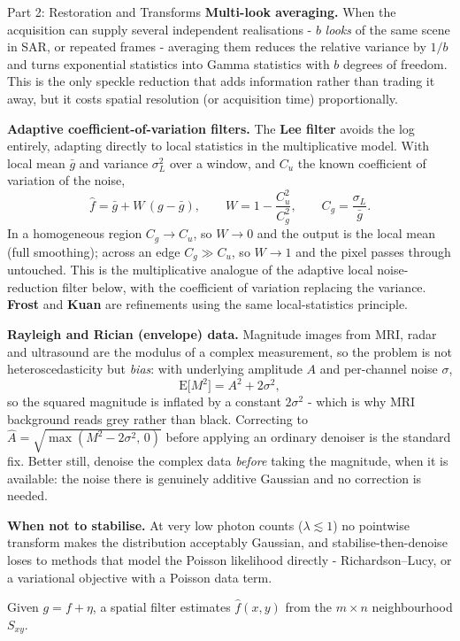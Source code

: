 \documentclass[letterpaper]{article}
\begin{document}
\begin{notes}{Part 2: Restoration and Transforms}
\textbf{Multi-look averaging.} When the acquisition can supply several independent realisations - $b$ \emph{looks} of the same scene in SAR, or repeated frames - averaging them reduces the relative variance by $1/b$ and turns exponential statistics into Gamma statistics with $b$ degrees of freedom. This is the only speckle reduction that adds information rather than trading it away, but it costs spatial resolution (or acquisition time) proportionally.

\textbf{Adaptive coefficient-of-variation filters.} The \textbf{Lee filter} avoids the log entirely, adapting directly to local statistics in the multiplicative model. With local mean $\bar g$ and variance $\sigma_L^2$ over a window, and $C_u$ the known coefficient of variation of the noise,
$$\hat f = \bar g + W\,(g - \bar g),\qquad W = 1 - \frac{C_u^2}{C_g^2},\qquad C_g = \frac{\sigma_L}{\bar g}.$$
In a homogeneous region $C_g\to C_u$, so $W\to0$ and the output is the local mean (full smoothing); across an edge $C_g\gg C_u$, so $W\to1$ and the pixel passes through untouched. This is the multiplicative analogue of the adaptive local noise-reduction filter below, with the coefficient of variation replacing the variance. \textbf{Frost} and \textbf{Kuan} are refinements using the same local-statistics principle.

\textbf{Rayleigh and Rician (envelope) data.} Magnitude images from MRI, radar and ultrasound are the modulus of a complex measurement, so the problem is not heteroscedasticity but \emph{bias}: with underlying amplitude $A$ and per-channel noise $\sigma$,
$$\mathrm{E}\bigl[M^2\bigr] = A^2 + 2\sigma^2,$$
so the squared magnitude is inflated by a constant $2\sigma^2$ - which is why MRI background reads grey rather than black. Correcting to $\hat A = \sqrt{\max(M^2-2\sigma^2,\,0)}$ before applying an ordinary denoiser is the standard fix. Better still, denoise the complex data \emph{before} taking the magnitude, when it is available: the noise there is genuinely additive Gaussian and no correction is needed.

\textbf{When not to stabilise.} At very low photon counts ($\lambda\lesssim1$) no pointwise transform makes the distribution acceptably Gaussian, and stabilise-then-denoise loses to methods that model the Poisson likelihood directly - Richardson--Lucy, or a variational objective with a Poisson data term.


Given $g = f + \eta$, a spatial filter estimates $\hat{f}(x,y)$ from the $m\times n$ neighbourhood $S_{xy}$.


\end{notes}
\end{document}
